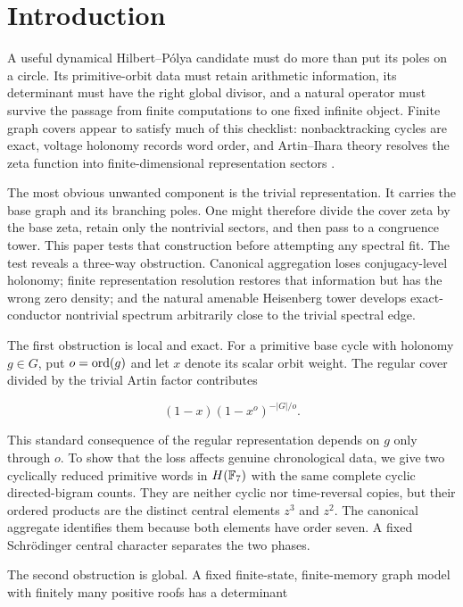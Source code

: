 \section{Introduction}
\label{sec:introduction}

A useful dynamical Hilbert--Pólya candidate must do more than put its poles on
a circle. Its primitive-orbit data must retain arithmetic information, its
determinant must have the right global divisor, and a natural operator must
survive the passage from finite computations to one fixed infinite object.
Finite graph covers appear to satisfy much of this checklist: nonbacktracking
cycles are exact, voltage holonomy records word order, and Artin--Ihara
theory resolves the zeta function into finite-dimensional representation
sectors \citep{stark1996finite,stark2000partii}.

The most obvious unwanted component is the trivial representation. It carries
the base graph and its branching poles. One might therefore divide the cover
zeta by the base zeta, retain only the nontrivial sectors, and then pass to a
congruence tower. This paper tests that construction before attempting any
spectral fit. The test reveals a three-way obstruction. Canonical aggregation
loses conjugacy-level holonomy; finite representation resolution restores
that information but has the wrong zero density; and the natural amenable
Heisenberg tower develops exact-conductor nontrivial spectrum arbitrarily
close to the trivial spectral edge.

The first obstruction is local and exact. For a primitive base cycle with
holonomy \(g\in G\), put \(o=\operatorname{ord}(g)\) and let \(x\) denote its scalar orbit
weight. The regular cover divided by the trivial Artin factor contributes

\[
(1-x)(1-x^o)^{-|G|/o}.
\]

This standard consequence of the regular representation depends on \(g\)
only through \(o\). To show that the loss affects genuine chronological data,
we give two cyclically reduced primitive words in \(H(\mathbb{F}_7)\) with the same
complete cyclic directed-bigram counts. They are neither cyclic nor
time-reversal copies, but their ordered products are the distinct central
elements \(z^3\) and \(z^2\). The canonical aggregate identifies them because
both elements have order seven. A fixed Schrödinger central character
separates the two phases.

The second obstruction is global. A fixed finite-state, finite-memory graph
model with finitely many positive roofs has a determinant

